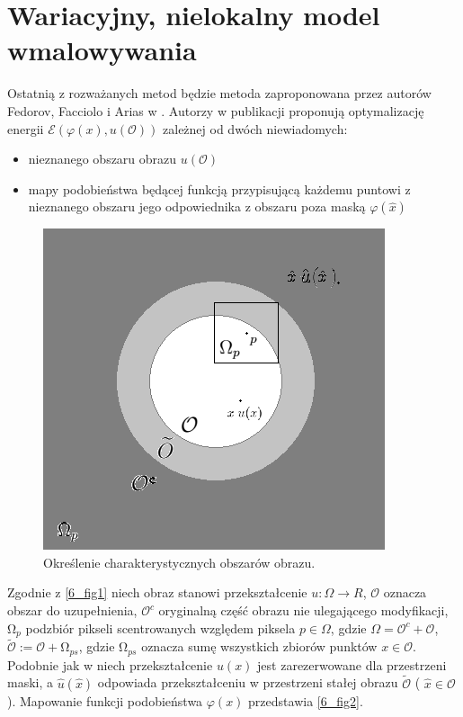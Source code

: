 \documentclass[12pt, twoside, openany]{report}
\theoremstyle{definition}
\begin{document}
\chapter{Wariacyjny, nielokalny model wmalowywania}
Ostatnią z rozważanych metod będzie metoda zaproponowana przez autorów Fedorov, Facciolo i Arias w \cite{arias2011variational}. Autorzy w publikacji proponują optymalizację energii $\mathcal{E}(\varphi(x), u(\mathcal{O}))$ zależnej od dwóch niewiadomych:
\begin{itemize}
\item
nieznanego obszaru obrazu $u(\mathcal{O})$
\item
mapy podobieństwa będącej funkcją przypisującą każdemu puntowi z nieznanego obszaru jego odpowiednika z obszaru poza maską $\varphi(\hat{x})$
\end{itemize}
\begin{figure}[!h]
	\centering
	\includegraphics[scale=0.9]{rysunki/6_fig1}
	\caption{Określenie charakterystycznych obszarów obrazu.}
	\label{6_fig1}
\end{figure}
Zgodnie z \autoref{6_fig1} niech obraz stanowi przekształcenie $ u : {\Omega} \rightarrow R$, $\mathcal{O}$ oznacza obszar do uzupełnienia, $\mathcal{O}^c$ oryginalną część obrazu nie ulegającego modyfikacji, $\mathrm{\Omega }_p$ podzbiór pikseli scentrowanych względem  piksela $p \in \Omega$, gdzie $\Omega = \mathcal{O}^c + \mathcal{O}$, $\widetilde{\mathcal{O}} := \mathcal{O} + \mathrm{\Omega }_{ps}$, gdzie $\mathrm{\Omega }_{ps}$ oznacza sumę wszystkich zbiorów punktów $x \in \mathcal{O}$. Podobnie jak w \cite{arias2011variational} niech przekształcenie $u(x)$ jest zarezerwowane dla przestrzeni maski, a $\hat{u}(\hat{x})$ odpowiada przekształceniu w przestrzeni stałej obrazu $\widetilde{\mathcal{O}}$ ( $\hat{x} \in \mathcal{O}$). Mapowanie funkcji podobieństwa $\varphi(x)$ przedstawia \autoref{6_fig2}.
\end{document}
